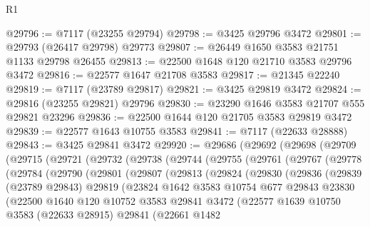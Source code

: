 \begin{lexlean}{R1}
\begin{coremodule}
@29796 := @7117 (@23255 @29794)
@29798 := @3425 @29796 @3472
@29801 := @29793 (@26417 @29798) @29773
@29807 := @26449 @1650 @3583 @21751 @1133 @29798 @26455
@29813 := @22500 @1648 @120 @21710 @3583 @29796 @3472
@29816 := @22577 @1647 @21708 @3583
@29817 := @21345 @22240
@29819 := @7117 (@23789 @29817)
@29821 := @3425 @29819 @3472
@29824 := @29816 (@23255 @29821) @29796
@29830 := @23290 @1646 @3583 @21707 @555 @29821 @23296
@29836 := @22500 @1644 @120 @21705 @3583 @29819 @3472
@29839 := @22577 @1643 @10755 @3583
@29841 := @7117 (@22633 @28888)
@29843 := @3425 @29841 @3472
@29920 := @29686
    (@29692
      (@29698
        (@29709
          (@29715
            (@29721
              (@29732
                (@29738
                  (@29744
                    (@29755
                      (@29761
                        (@29767
                          (@29778
                            (@29784
                              (@29790
                                (@29801
                                  (@29807
                                    (@29813
                                      (@29824
                                        (@29830
                                          (@29836
                                            (@29839
                                              (@23789 @29843)
                                              @29819
                                              (@23824
                                                @1642
                                                @3583
                                                @10754
                                                @677
                                                @29843
                                                @23830
                                                (@22500
                                                  @1640
                                                  @120
                                                  @10752
                                                  @3583
                                                  @29841
                                                  @3472
                                                  (@22577
                                                    @1639
                                                    @10750
                                                    @3583
                                                    (@22633 @28915)
                                                    @29841
                                                    (@22661
                                                      @1482

\end{coremodule}
\end{lexlean}
